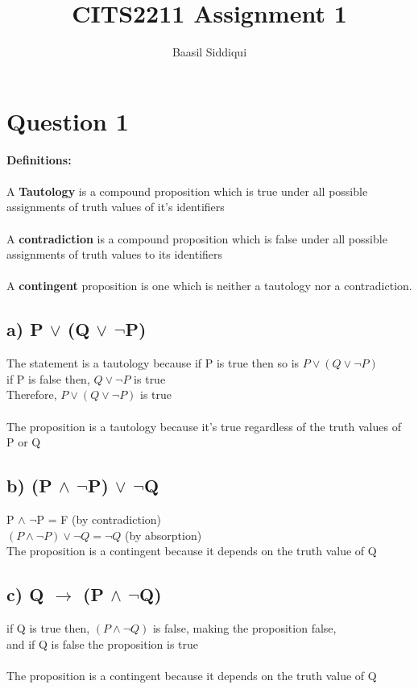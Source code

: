\documentclass[11pt]{article}
\title{\textbf{CITS2211 Assignment 1}}
\author{Baasil Siddiqui}
\date{}
\begin{document}
\parskip 2mm
\maketitle
\thispagestyle{empty}

\section*{Question 1}
\textbf{Definitions:} \\ \\
A \textbf{Tautology} is a compound proposition which is true under all possible
assignments of truth values of it's identifiers\\
\\
A \textbf{contradiction} is a compound proposition which is
false under all possible assignments of truth values to its identifiers\\
\\
A \textbf{contingent} proposition is one which is neither a tautology
nor a contradiction.
%
\subsection*{a) P $\lor$ (Q $\lor$ $\neg$P)}
The statement is a tautology because if P is true then so is $P \lor (Q \lor \neg P)$ \\
if P is false then, $Q \lor \neg P$ is true \\
Therefore, $P \lor (Q \lor \neg P)$ is true\\\\
The proposition is a tautology because it's true regardless of the truth values of P or Q

\subsection*{b) (P $\land$ $\neg$P) $\lor$ $\neg$Q}

P $\land$ $\neg$P = F (by contradiction) \\
$(P \land \neg P) \lor \neg Q = \neg Q$ (by absorption) \\
\newline
The proposition is a contingent because it depends on the truth value of Q


\subsection*{c) Q $\rightarrow$ (P $\land$ $\neg$Q)}
if Q is true then, $(P \land \neg Q)$ is false, making the proposition false, \\
and if Q is false the proposition is true \\ \\
The proposition is a contingent because it depends on the truth value of Q
\end{document}
